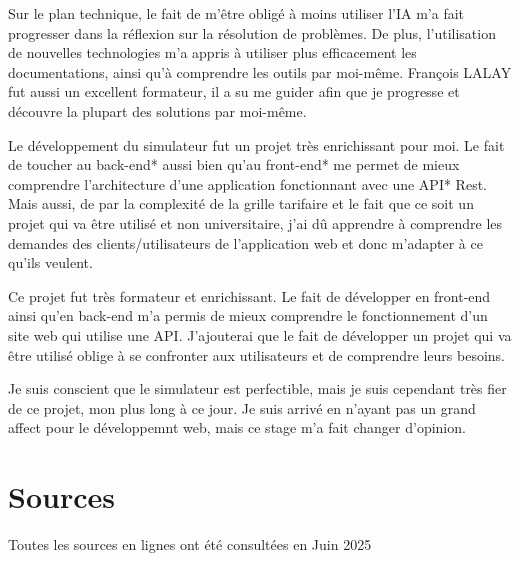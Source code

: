 \documentclass[a4paper,12pt]{report}
\begin{document}
\vspace{1em}

Sur le plan technique, le fait de m'être obligé à moins utiliser l'IA m'a fait progresser dans la réflexion sur la résolution de problèmes. De plus, l'utilisation de nouvelles technologies m'a appris à utiliser plus efficacement les documentations, ainsi qu'à comprendre les outils par moi-même. François LALAY fut aussi un excellent formateur, il a su me guider afin que je progresse et découvre la plupart des solutions par moi-même.

\vspace{1em}

Le développement du simulateur fut un projet très enrichissant pour moi. Le fait de toucher au back-end* aussi bien qu'au front-end* me permet de mieux comprendre l'architecture d'une application fonctionnant avec une API* Rest. Mais aussi, de par la complexité de la grille tarifaire et le fait que ce soit un projet qui va être utilisé et non universitaire, j'ai dû apprendre à comprendre les demandes des clients/utilisateurs de l'application web et donc m'adapter à ce qu'ils veulent.

Ce projet fut très formateur et enrichissant. Le fait de développer en front-end ainsi qu'en back-end m'a permis de mieux comprendre le fonctionnement d'un site web qui utilise une API. J'ajouterai que le fait de développer un projet qui va être utilisé oblige à se confronter aux utilisateurs et de comprendre leurs besoins.

\vspace{1em}

Je suis conscient que le simulateur est perfectible, mais je suis cependant très fier de ce projet, mon plus long à ce jour. Je suis arrivé en n'ayant pas un grand affect pour le développemnt web, mais ce stage m'a fait changer d'opinion.

\chapter{Sources}
Toutes les sources en lignes ont été consultées en Juin 2025
\end{document}
